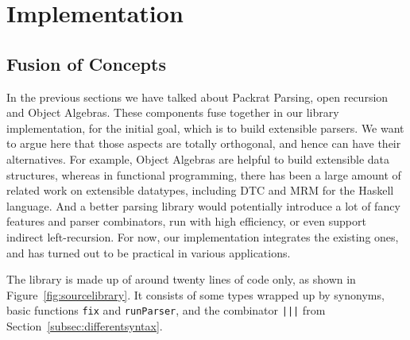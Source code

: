 \section{Implementation}\label{sec:implementation}


\subsection{Fusion of Concepts}\label{subsec:fusion}


In the previous sections we have talked about Packrat Parsing, open recursion and Object Algebras. These components fuse together in our library implementation, for the initial goal, which is to build extensible parsers. We want to argue here that those aspects are totally orthogonal, and hence can have their alternatives. For example, Object Algebras are helpful to build extensible data structures, whereas in functional programming, there has been a large amount of related work on extensible datatypes, including DTC and MRM for the Haskell language. And a better
parsing library would potentially introduce a lot of fancy features and parser combinators, run with high efficiency, or even support indirect left-recursion.
 For now, our implementation integrates the existing ones, and has turned out to be practical in various applications.

The library is made up of around twenty lines of code only, as shown in Figure~\ref{fig:sourcelibrary}. It consists of some types wrapped up by synonyms, basic functions \lstinline{fix} and \lstinline{runParser}, and the combinator \lstinline{|||} from Section~\ref{subsec:differentsyntax}.


